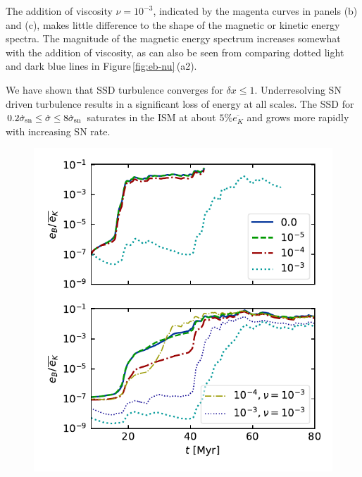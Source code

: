 \documentclass[preprint2]{aastex63}
\newcommand\SNr{\dot\sigma_{\rm sn}}
\newcommand\dx{ {\delta x}}
\begin{document}
{ {The addition of viscosity $\nu=10^{-3}$, indicated by the magenta curves in
 panels (b) and (c), {makes little difference to the shape of the
   magnetic or kinetic energy spectra.  The magnitude of the magnetic
   energy spectrum increases somewhat with the addition of viscosity,
   as can also be seen from comparing dotted light and dark blue
   lines in Figure\,\ref{fig:eb-nu}\,(a2).}
   }

 {We have shown that SSD turbulence {converges} for $\dx\leq1$.
 Underresolving SN driven turbulence results in a significant loss of energy
 at all scales. {The}
 SSD for $0.2\SNr\leq \dot\sigma \leq 8\SNr$ saturates in the ISM at about
 $5\%\overline{e_K}$ and grows more rapidly with increasing SN rate.
 } 

\begin{figure}
  \includegraphics[trim=0.5cm 0.0cm 0.3cm 0.0cm, clip=true,width=\columnwidth]{figs/1pc-eB-nu0.pdf}

\end{figure}}
\end{document}
